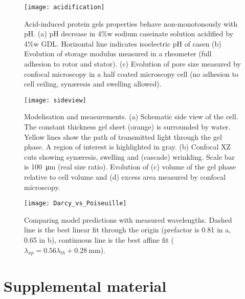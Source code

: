 \documentclass[twocolumn,superscriptaddress,showpacs,preprintnumbers,amsmath,amssymb,prl]{revtex4-1}
\begin{document}
\begin{figure}
	\texttt{[image: acidification]}
	\caption{Acid-induced protein gels properties behave non-monotonously with pH. (a) pH decrease in 4\%w sodium caseinate solution acidified by 4\%w GDL. Horizontal line indicates isoelectric pH of casen (b) Evolution of storage modulus measured in a rheometer (full adhesion to rotor and stator). (c) Evolution of pore size measured by confocal microscopy in a half coated microscopy cell (no adhesion to cell ceiling, syn\ae{}resis and swelling allowed).}
	\label{fig:acidification}
\end{figure}

\begin{figure}
	\texttt{[image: sideview]}
	\caption{Modelisation  and measurements. (a) Schematic side view of the cell. The constant thickness gel sheet (orange) is surrounded by water. Yellow lines show the path of transmitted light through the gel phase. A region of interest is highlighted in gray. (b) Confocal XZ cuts showing syn\ae{}resis, swelling and (cascade) wrinkling. Scale bar is \SI{100}{\micro\metre} (real size ratio). Evolution of (c) volume of the gel phase relative to cell volume and (d) excess area measured by confocal microscopy.}
	\label{fig:sideview}
\end{figure}

\begin{figure*}
	\texttt{[image: Darcy\_vs\_Poiseuille]}
	\caption{Comparing model predictions with measured wavelengths. Dashed line is the best linear fit through the origin (prefactor is 0.81 in a, 0.65 in b), continuous line is the best affine fit ($\lambda_{xp}=0.56\lambda_{th}+\SI{0.28}{\milli\metre}$).}
	\label{fig:DarcyPoiseuille}
\end{figure*}

\clearpage
\newpage
\setcounter{figure}{0}

\section*{Supplemental material}
\end{document}
